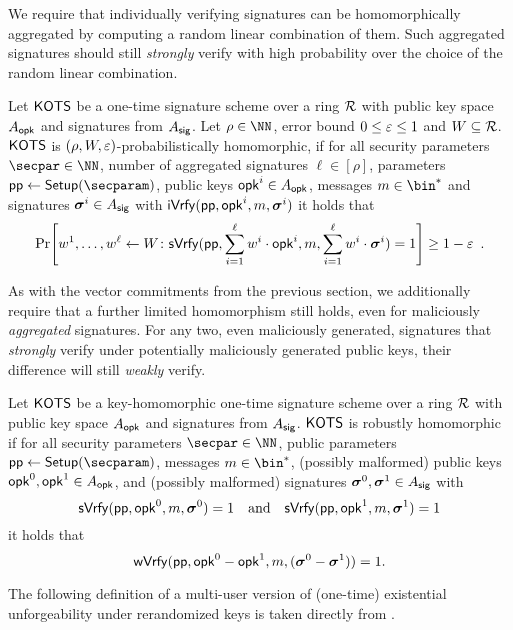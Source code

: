 We require that individually verifying signatures can be homomorphically aggregated by computing a random linear combination of them.
Such aggregated signatures should still \emph{strongly} verify with high probability over the choice of the random linear combination.

\begin{definition}
  Let $\mathsf{KOTS}$ be a one-time signature scheme over a ring $\mathcal{R}$ with public key space $A_{\mathsf{opk}}$ and signatures from $A_{\mathsf{sig}}$.
  Let $\rho \in \NN$, error bound $0\leq \varepsilon \leq 1$ and $W\subseteq \mathcal{R}$.
  $\mathsf{KOTS}$ is $(\rho,W,\varepsilon)$-probabilistically homomorphic, if 
  for all security parameters $\secpar\in\NN$, number of aggregated signatures $\ell\in[\rho]$, parameters $\params \gets \setup(\secparam)$, public keys $\mathsf{opk}^i \in A_{\mathsf{opk}}$, messages $m\in\bin^*$ and signatures $\boldsymbol{\sigma}^i\in A_{\mathsf{sig}}$ with $\mathsf{iVrfy}(\mathsf{pp},\mathsf{opk}^i,m,\boldsymbol{\sigma}^i)$ it holds that
  \[
    \Pr\mleft[
      w^1,\dots,w^\ell\gets W
      \colon
      \sverify(\params,\sum_{i=1}^{\ell}w^i\cdot\opk^i,m,\sum_{i=1}^{\ell}w^i\cdot\vec{\sigma}^i) = 1
    \mright]\geq 1-\errorbound\enspace.
  \]
\end{definition}

As with the vector commitments from the previous section, we additionally require that a further limited homomorphism still holds, even for maliciously \emph{aggregated} signatures.
For any two, even maliciously generated, signatures that \emph{strongly} verify under potentially maliciously generated public keys, their difference will still \emph{weakly} verify.

\begin{definition}
  \label{def:malhomhots}
  Let $\mathsf{KOTS}$ be a key-homomorphic one-time signature scheme over a ring $\mathcal{R}$ with public key space $A_{\mathsf{opk}}$ and signatures from $A_{\mathsf{sig}}$.
  $\mathsf{KOTS}$ is robustly homomorphic if for all security parameters $\secpar\in\NN$, public parameters $\params\gets\setup(\secparam)$, messages $m\in\bin^*$, (possibly malformed) public keys $\mathsf{opk}^0,\mathsf{opk}^1 \in A_{\mathsf{opk}}$, and (possibly malformed) signatures $\boldsymbol{\sigma}^0,\boldsymbol{\sigma}^1\in A_{\mathsf{sig}}$ with
  \[
    \mathsf{sVrfy}(\mathsf{pp},\mathsf{opk}^0, m,\boldsymbol{\sigma}^0)=1 \quad \text{and} \quad \mathsf{sVrfy}(\mathsf{pp},\mathsf{opk}^1, m,\boldsymbol{\sigma}^1)=1
  \]
  it holds that
  \[
    \mathsf{wVrfy}(\mathsf{pp},\mathsf{opk}^0-\mathsf{opk}^1, m,(\boldsymbol{\sigma}^0-\boldsymbol{\sigma}^1))=1.
  \]
\end{definition}

The following definition of a multi-user version of (one-time) existential unforgeability under rerandomized keys is taken directly from \cite{CCS:FleSimZha22}.

